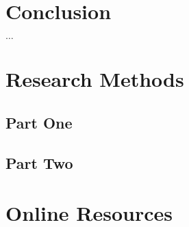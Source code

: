 \documentclass[acmtog]{acmart}
\begin{document}
	\section{Conclusion}\label{sec:conclusion}



\begin{acks}
	$\ldots$
\end{acks}





\appendix

\section{Research Methods}\label{sec:research-methods}

	\subsection{Part One}\label{subsec:part-one}

	\subsection{Part Two}\label{subsec:part-two}


	\section{Online Resources}\label{sec:online-resources}
\end{document}
